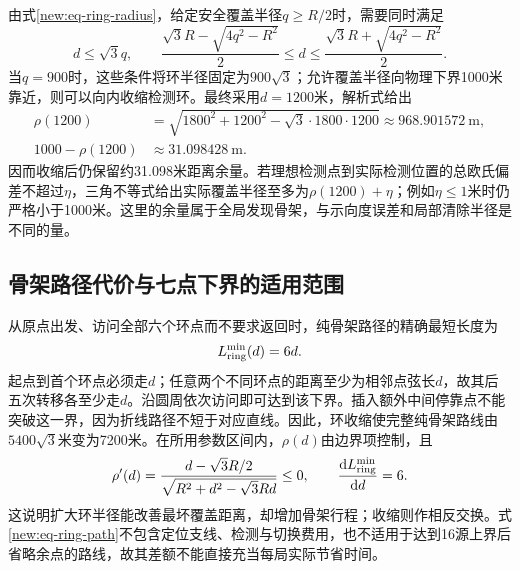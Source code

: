 由式\eqref{new:eq-ring-radius}，给定安全覆盖半径$q\ge R/2$时，需要同时满足
\begin{equation}\label{new:eq-ring-feasible}
d\le\sqrt3q,\qquad
\frac{\sqrt3R-\sqrt{4q^2-R^2}}2\le d\le
\frac{\sqrt3R+\sqrt{4q^2-R^2}}2.
\end{equation}
当$q=900$时，这些条件将环半径固定为$900\sqrt3$；允许覆盖半径向物理下界1000米靠近，则可以向内收缩检测环。最终采用$d=1200$米，解析式给出
\begin{equation}\label{new:eq-ring-margin}
\begin{aligned}
\rho(1200)&=\sqrt{1800^2+1200^2-\sqrt3\cdot1800\cdot1200}
\approx968.901572\ \mathrm m,\\
1000-\rho(1200)&\approx31.098428\ \mathrm m.
\end{aligned}
\end{equation}
因而收缩后仍保留约31.098米距离余量。若理想检测点到实际检测位置的总欧氏偏差不超过$\eta$，三角不等式给出实际覆盖半径至多为$\rho(1200)+\eta$；例如$\eta\le1$米时仍严格小于1000米。这里的余量属于全局发现骨架，与示向度误差和局部清除半径是不同的量。

\subsection{骨架路径代价与七点下界的适用范围}
从原点出发、访问全部六个环点而不要求返回时，纯骨架路径的精确最短长度为
\begin{equation}\label{new:eq-ring-path}
L_{\rm ring}^{\min}(d)=6d.
\end{equation}
起点到首个环点必须走$d$；任意两个不同环点的距离至少为相邻点弦长$d$，故其后五次转移各至少走$d$。沿圆周依次访问即可达到该下界。插入额外中间停靠点不能突破这一界，因为折线路径不短于对应直线。因此，环收缩使完整纯骨架路线由$5400\sqrt3$米变为7200米。在所用参数区间内，$\rho(d)$由边界项控制，且
\[
\rho'(d)=\frac{d-\sqrt3R/2}{\sqrt{R^2+d^2-\sqrt3Rd}}\le0,
\qquad \frac{\mathrm d L_{\rm ring}^{\min}}{\mathrm d d}=6.
\]
这说明扩大环半径能改善最坏覆盖距离，却增加骨架行程；收缩则作相反交换。式\eqref{new:eq-ring-path}不包含定位支线、检测与切换费用，也不适用于达到16源上界后省略余点的路线，故其差额不能直接充当每局实际节省时间。

